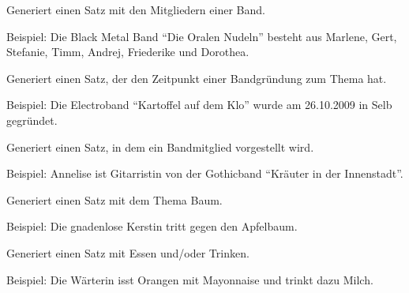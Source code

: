 \documentclass[a4paper,12pt,oneside]{sphinxmanual}
\begin{document}

\begin{fulllineitems}
\label{module:pyzufall.satz.satz_band_besetzung}
Generiert einen Satz mit den Mitgliedern einer Band.

Beispiel: Die Black Metal Band ``Die Oralen Nudeln'' besteht aus Marlene, Gert, Stefanie, Timm, Andrej, Friederike und Dorothea.

\end{fulllineitems}


\begin{fulllineitems}
\label{module:pyzufall.satz.satz_band_gegruendet}
Generiert einen Satz, der den Zeitpunkt einer Bandgründung zum Thema hat.

Beispiel: Die Electroband ``Kartoffel auf dem Klo'' wurde am 26.10.2009 in Selb gegründet.

\end{fulllineitems}


\begin{fulllineitems}
\label{module:pyzufall.satz.satz_band_mitglied}
Generiert einen Satz, in dem ein Bandmitglied vorgestellt wird.

Beispiel: Annelise ist Gitarristin von der Gothicband ``Kräuter in der Innenstadt''.

\end{fulllineitems}


\begin{fulllineitems}
\label{module:pyzufall.satz.satz_baum}
Generiert einen Satz mit dem Thema Baum.

Beispiel: Die gnadenlose Kerstin tritt gegen den Apfelbaum.

\end{fulllineitems}


\begin{fulllineitems}
\label{module:pyzufall.satz.satz_essen}
Generiert einen Satz mit Essen und/oder Trinken.

Beispiel: Die Wärterin isst Orangen mit Mayonnaise und trinkt dazu Milch.

\end{fulllineitems}
\end{document}
